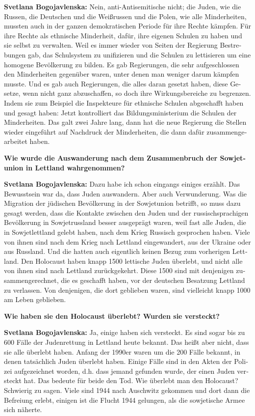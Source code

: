 \begin{otherlanguage}{ngerman}
\textbf{Svetlana Bogojavlenska:}  Nein, anti-Antisemitische nicht; die Juden, wie die Russen, die Deutschen und die Weißrussen und die Polen, wie alle Minderheiten, mussten auch in der ganzen demokratischen Periode für ihre Rechte kämpfen. Für ihre Rechte als ethnische Minderheit, dafür, ihre eigenen Schulen zu haben und sie selbst zu verwalten. Weil es immer wieder von Seiten der Regierung Bestrebungen gab, das Schulsystem zu unifizieren und die Schulen zu lettisieren um eine homogene Bevölkerung zu bilden. Es gab Regierungen, die sehr aufgeschlossen den Minderheiten gegenüber waren, unter denen man weniger darum kämpfen musste. Und es gab auch Regierungen, die alles daran gesetzt haben, diese Gesetze, wenn nicht ganz abzuschaffen, so doch ihre Wirkungsbereiche zu begrenzen. Indem sie zum Beispiel die Inspekteure für ethnische Schulen abgeschafft haben und gesagt haben: Jetzt kontrolliert das Bildungsministerium die Schulen der Minderheiten. Das galt zwei Jahre lang, dann hat die neue Regierung die Stellen wieder eingeführt auf Nachdruck der Minderheiten, die dann dafür zusammengearbeitet haben.

\textbf{Wie wurde die Auswanderung nach dem Zusammenbruch der Sowjetunion in Lettland wahrgenommen?}

\textbf{Svetlana Bogojavlenska:}  Dazu habe ich schon eingangs einiges erzählt. Das Bewusstsein war da, dass Juden auswandern. Aber auch Verwunderung. Was die Migration der jüdischen Bevölkerung in der Sowjetunion betrifft, so muss dazu gesagt werden, dass die Kontakte zwischen den Juden und der russischsprachigen Bevölkerung in Sowjetrussland besser ausgeprägt waren, weil fast alle Juden, die in Sowjetlettland gelebt haben, nach dem Krieg Russisch gesprochen haben. Viele von ihnen sind nach dem Krieg nach Lettland eingewandert, aus der Ukraine oder aus Russland. Und die hatten auch eigentlich keinen Bezug zum vorherigen Lettland. Den Holocaust haben knapp 1500 lettische Juden überlebt, und nicht alle von ihnen sind nach Lettland zurückgekehrt. Diese 1500 sind mit denjenigen zusammengerechnet, die es geschafft haben, vor der deutschen Besatzung Lettland zu verlassen. Von denjenigen, die dort geblieben waren, sind vielleicht knapp 1000 am Leben geblieben.

\textbf{Wie haben sie den Holocaust überlebt? Wurden sie versteckt?}

\textbf{Svetlana Bogojavlenska:} Ja, einige haben sich versteckt. Es sind sogar bis zu 600 Fälle der Judenrettung in Lettland heute bekannt. Das heißt aber nicht, dass sie alle überlebt haben. Anfang der 1990er waren um die 200 Fälle bekannt, in denen tatsächlich Juden überlebt haben. Einige Fälle sind in den Akten der Polizei aufgezeichnet worden, d.h. dass jemand gefunden wurde, der einen Juden versteckt hat. Das bedeute für beide den Tod. Wie überlebt man den Holocaust? Schwierig zu sagen. Viele sind 1944 nach Auschwitz gekommen und dort dann die Befreiung erlebt, einigen ist die Flucht 1944 gelungen, als die sowjetische Armee sich näherte.


\end{otherlanguage}
